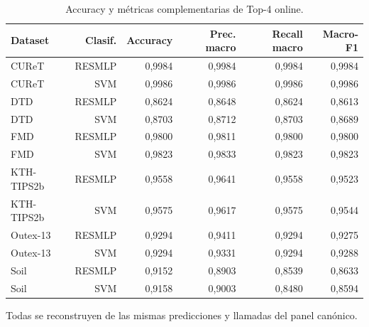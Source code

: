 \begin{table}[!htbp]\centering
\fontsize{8}{10}\selectfont\setlength{\tabcolsep}{4pt}
\caption{Accuracy y métricas complementarias de Top-4 online.}\label{tab:accuracy-online-metrics}
\begin{tabular}{@{}lrrrrr@{}}\toprule
Dataset & Clasif. & Accuracy & Prec. macro & Recall macro & Macro-F1\\\midrule
CUReT & RESMLP & 0,9984 & 0,9984 & 0,9984 & 0,9984\\
CUReT & SVM & 0,9986 & 0,9986 & 0,9986 & 0,9986\\
DTD & RESMLP & 0,8624 & 0,8648 & 0,8624 & 0,8613\\
DTD & SVM & 0,8703 & 0,8712 & 0,8703 & 0,8689\\
FMD & RESMLP & 0,9800 & 0,9811 & 0,9800 & 0,9800\\
FMD & SVM & 0,9823 & 0,9833 & 0,9823 & 0,9823\\
KTH-TIPS2b & RESMLP & 0,9558 & 0,9641 & 0,9558 & 0,9523\\
KTH-TIPS2b & SVM & 0,9575 & 0,9617 & 0,9575 & 0,9544\\
Outex-13 & RESMLP & 0,9294 & 0,9411 & 0,9294 & 0,9275\\
Outex-13 & SVM & 0,9294 & 0,9331 & 0,9294 & 0,9288\\
Soil & RESMLP & 0,9152 & 0,8903 & 0,8539 & 0,8633\\
Soil & SVM & 0,9158 & 0,9003 & 0,8480 & 0,8594\\
\bottomrule\end{tabular}
\par\smallskip\begin{minipage}{0.98\textwidth}\footnotesize Todas se reconstruyen de las mismas predicciones y llamadas del panel canónico.\end{minipage}
\end{table}
